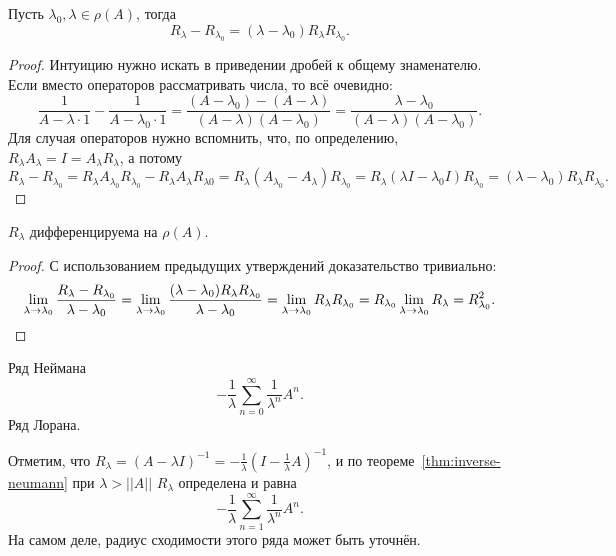 \documentclass[main]{subfiles}
\begin{document}
\begin{proposition} %
  Пусть \( \lambda_0, \lambda \in \rho(A) \), тогда
  \[
    R_\lambda - R_{\lambda_0} = (\lambda - \lambda_0)
    R_\lambda R_{\lambda_0}.
  \]
\end{proposition}
\begin{proof}
  Интуицию нужно искать в приведении дробей к общему знаменателю.
  Если вместо операторов рассматривать числа, то всё очевидно:
  \[
    \frac1{A - \lambda \cdot 1} - \frac{1}{A - \lambda_0 \cdot 1} =
    \frac{(A - \lambda_0) - (A - \lambda)}{(A - \lambda)(A - \lambda_0)} =
    \frac{\lambda - \lambda_0}{(A - \lambda)(A - \lambda_0)}.
  \]
  Для случая операторов нужно вспомнить, что, по определению,
  \( R_\lambda A_\lambda = I = A_\lambda R_\lambda \),
  а потому
  \[ R_\lambda - R_{\lambda_0} = 
    R_\lambda A_{\lambda_0} R_{\lambda_0} -
    R_\lambda A_\lambda R_{\lambda 0} =
    R_\lambda (A_{\lambda_0} - A_\lambda) R_{\lambda_0} =
    R_\lambda (\lambda I - \lambda_0 I) R_{\lambda_0} =
    (\lambda - \lambda_0) R_\lambda R_{\lambda_0}.
  \]
\end{proof}

\begin{proposition} %
  \( R_\lambda \) дифференцируема на \( \rho(A) \).
\end{proposition}
\begin{proof}
  С использованием предыдущих утверждений доказательство тривиально:
  \[
    \lim_{\lambda \to \lambda_0}
    \frac{R_\lambda - R_{\lambda_0}}{\lambda - \lambda_0} =
    \lim_{\lambda \to \lambda_0}
    \frac{(\lambda - \lambda_0) R_\lambda R_{\lambda_0}}{\lambda - \lambda_0} =
    \lim_{\lambda \to \lambda_0} R_\lambda R_{\lambda_0} =
    R_{\lambda_0} \lim_{\lambda \to \lambda_0} R_\lambda = R_{\lambda_0}^2.
    \qedhere
  \]
\end{proof}

Ряд Неймана
\[
  -\frac{1}{\lambda} \sum_{n=0}^\infty \frac{1}{\lambda^n} A^n.
\]
Ряд Лорана.

Отметим, что
\( R_\lambda = (A - \lambda I)^{-1} = -\frac1\lambda
(I - \frac1\lambda A)^{-1} \),
и по теореме~\ref{thm:inverse-neumann}
при \( \lambda > ||A|| \) \( R_\lambda \)
определена и равна
\[ -\frac1\lambda \sum_{n=1}^\infty \frac1{\lambda^n} A^n. \]
На самом деле, радиус сходимости этого
ряда может быть уточнён.
\end{document}
